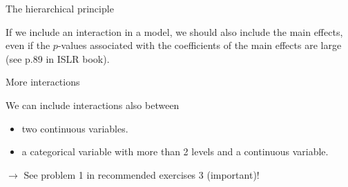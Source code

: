 \documentclass[
  10pt,
  ignorenonframetext,
]{beamer}
\providecommand{\tightlist}{%
  \setlength{\itemsep}{0pt}\setlength{\parskip}{0pt}}
\begin{document}
\begin{frame}
\begin{block}{The hierarchical principle}
\protect\hypertarget{the-hierarchical-principle}{}
\(~\)

If we include an interaction in a model, we should also include the main
effects, even if the \(p\)-values associated with the coefficients of
the main effects are large (see p.89 in ISLR book).
\end{block}
\end{frame}

\begin{frame}
\begin{block}{More interactions}
\protect\hypertarget{more-interactions}{}
\vspace{4mm}

We can include interactions also between

\begin{itemize}
\tightlist
\item
  two continuous variables.
\item
  a categorical variable with more than 2 levels and a continuous
  variable.
\end{itemize}

\vspace{4mm}

\(\rightarrow\) See problem 1 in recommended exercises 3 (important)!

\vspace{4mm}
\end{block}
\end{frame}
\end{document}
